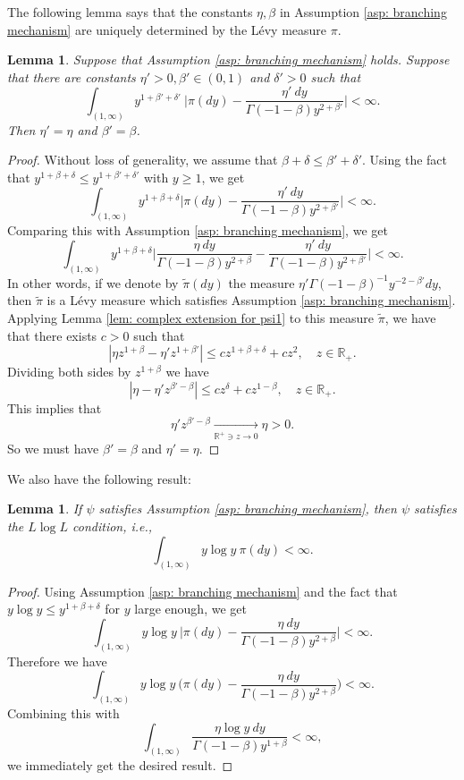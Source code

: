 \documentclass[12pt,a4paper]{amsart}
\theoremstyle{plain}
\newtheorem{lem}[thm]{Lemma}
\theoremstyle{definition}
\numberwithin{equation}{section}
\begin{document}
The following lemma says that the constants $\eta, \beta$ in Assumption \ref{asp: branching mechanism} are uniquely determined by the L\'evy measure $\pi$.
\begin{lem}
\label{lem: unique of beta and eta}
Suppose that Assumption  \ref{asp: branching mechanism} holds.
	Suppose that there are constants $\eta'>0, \beta'\in (0,1)$ and $\delta' > 0$ such that
\[
	 \int_{(1,\infty)}y^{1+\beta' +\delta'}~\Big|\pi(dy)-\frac{\eta'~dy}{\Gamma(-1-\beta)y^{2+\beta'}}\Big| <\infty.
\]
	Then $\eta'= \eta$ and $\beta ' = \beta$.
\end{lem}
\begin{proof}
	Without loss of generality, we assume that $\beta+\delta \leq \beta'+ \delta'$.
	Using  the fact that $y^{1+\beta+ \delta} \leq y^{1+\beta'+\delta'}$ with $y \geq 1$, we get
\[
	\int_{(1,\infty)} y^{1+\beta + \delta} \Big|\pi(dy)-\frac{\eta'~dy}{\Gamma(-1-\beta)y^{2+\beta'}}\Big| <\infty.
\]
	Comparing this with Assumption \ref{asp: branching mechanism}, we get
\[
	\int_{(1,\infty)} y^{1+\beta + \delta} \Big|\frac{\eta~dy}{\Gamma(-1-\beta)y^{2+\beta}}-\frac{\eta'~dy}{\Gamma(-1-\beta)y^{2+\beta'}}\Big| <\infty.
\]
	In other words, if we denote by $\widetilde \pi(dy)$ the measure $\eta' \Gamma(-1-\beta)^{-1} y^{-2-\beta'} dy$, then $\widetilde \pi$ is a L\'evy measure which satisfies Assumption \ref{asp: branching mechanism}.
	Applying Lemma \ref{lem: complex extension for psi1} to this measure $\widetilde \pi$, we have that there exists $c>0$ such that
\[
	|\eta z^{1+\beta} - \eta' z^{1+\beta'} |
	\leq cz^{1+\beta+ \delta}+cz^2,
	\quad z \in \mathbb R_+.
\]
Dividing both sides by $z^{1+\beta}$ we have
\[
	|\eta - \eta' z^{\beta' - \beta} |
	\leq cz^{\delta}+cz^{1-\beta},
	\quad z \in \mathbb R_+.
\]
	This implies that
\[
	\eta' z^{\beta' - \beta} \xrightarrow[\mathbb R^+\ni z\to 0]{} \eta >0.
\]
	So we must have $\beta'= \beta$ and $\eta'= \eta$.
\end{proof}

	We also have the following result:
\begin{lem}
\label{lem: LlogL criterion}
If $\psi$ satisfies Assumption  \ref{asp: branching mechanism}, then $\psi$ satisfies
the $L \log L$ condition, i.e.,
\[
    \int_{(1,\infty)} y \log y~\pi(dy)< \infty.
\]
\end{lem}
\begin{proof}
	Using  Assumption \ref{asp: branching mechanism} and the fact that $y\log y \leq y^{1+\beta+\delta}$ for $y$ large enough, we get
\[
	\int_{(1,\infty)}y\log y~\Big|\pi(dy)-\frac{\eta~dy}{\Gamma(-1-\beta)y^{2+\beta}}\Big| <\infty.
\]
	Therefore we have
\[
	\int_{(1,\infty)}y\log y~\Big(\pi(dy)-\frac{\eta~dy}{\Gamma(-1-\beta)y^{2+\beta}}\Big) < \infty.
\]
Combining this with
\[
	\int_{(1,\infty)}\frac{\eta \log y~dy}{\Gamma(-1-\beta)y^{1+\beta}} < \infty,
\]
we immediately get the desired result.
\end{proof}
\end{document}

